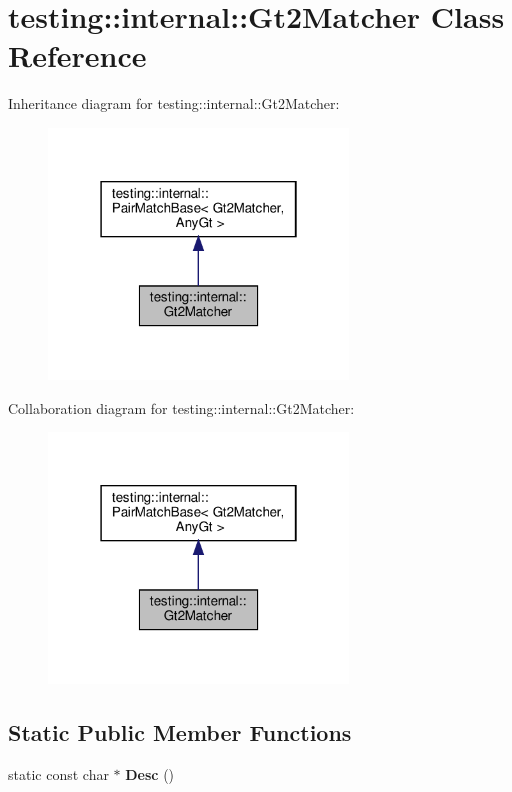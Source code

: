 \hypertarget{classtesting_1_1internal_1_1_gt2_matcher}{}\section{testing\+:\+:internal\+:\+:Gt2\+Matcher Class Reference}
\label{classtesting_1_1internal_1_1_gt2_matcher}


Inheritance diagram for testing\+:\+:internal\+:\+:Gt2\+Matcher\+:
\nopagebreak
\begin{figure}[H]
\begin{center}
\leavevmode
\includegraphics[width=226pt]{classtesting_1_1internal_1_1_gt2_matcher__inherit__graph}
\end{center}
\end{figure}


Collaboration diagram for testing\+:\+:internal\+:\+:Gt2\+Matcher\+:
\nopagebreak
\begin{figure}[H]
\begin{center}
\leavevmode
\includegraphics[width=226pt]{classtesting_1_1internal_1_1_gt2_matcher__coll__graph}
\end{center}
\end{figure}
\subsection*{Static Public Member Functions}
\begin{DoxyCompactItemize}
\item 
\mbox{\label{classtesting_1_1internal_1_1_gt2_matcher_a195be80a6c19ff32fc7b6c1e26aa60da}} 
static const char $\ast$ {\bfseries Desc} ()
\end{DoxyCompactItemize}
